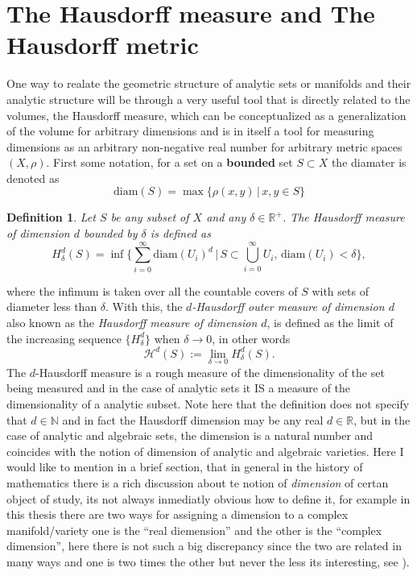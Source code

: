\documentclass[12pt,twoside,a4paper]{report}
\newtheorem{definition}{Definition}[section]
\newcommand{\nat}{\ensuremath{ \mathbb N }}
\newcommand{\re}{\ensuremath{\mathbb R }}
\begin{document}
  \section{The Hausdorff measure and The Hausdorff metric}
  \noindent One way to realate the geometric structure of analytic sets or manifolds and their analytic structure will be through a very useful tool that is directly related to the volumes, the Hausdorff measure, which can be conceptualized as a generalization of the volume for arbitrary dimensions and is in itself a tool for measuring dimensions as an arbitrary non-negative real number for arbitrary metric spaces $(X,\rho)$. First some notation, for a set on a \textbf{bounded} set $S\subset X$ the diamater is denoted as
  \[
  \textrm{diam}(S)=\max\{\rho(x,y)\,|\,x,y\in S\}
  \]
  \begin{definition}
  Let $S$ be any subset of $X$ and any $\delta\in\re^{+}$. The Hausdorff measure of dimension $d$ bounded by $\delta$ is defined as
  \[
  H_{\delta}^{d}(S)=\inf\Big\{\sum_{i=0}^{\infty}\mathrm{diam}(U_i)^{d}\,|\,S\subset\bigcup_{i=0}^{\infty}U_i,\,\mathrm{diam}(U_i)<\delta\Big\},
  \]
  \end{definition}
  \noindent where the infimum is taken over all the countable covers of $S$ with sets of diameter less than $\delta$. With this, the \emph{$d$-Hausdorff outer measure of dimension $d$} also known as the \emph{Hausdorff measure of dimension $d$}, is defined as the limit of the increasing sequence $\{H_{\delta}^d\}$ when $\delta\rightarrow 0$, in other words
  \[
  \mathcal{H}^d(S):=\lim_{\delta\rightarrow 0}H_{\delta}^d(S).
  \]
  The $d$-Hausdorff measure is a rough measure of the dimensionality of the set being measured and in the case of analytic sets it IS a measure of the dimensionality of a analytic subset. Note here that the definition does not specify that $d\in\nat$ and in fact the Hausdorff dimension may be any real $d\in\re$, but in the case of analytic and algebraic sets, the dimension is a natural number and coincides with the notion of dimension of analytic and algebraic varieties. Here I would like to mention in a brief section, that in general in the history of mathematics there is a rich discussion about te notion of \emph{dimension} of certan object of study, its not always inmediatly obvious how to define it, for example in this thesis there are two ways for assigning a dimension to a complex manifold/variety one is the ``real diemension'' and the other is the ``complex dimension'', here there is not such a big discrepancy since the two are related in many ways and one is two times the other but never the less its interesting, see \cite{YURI-MANIM:ON-THE-NOTION-OF-DIMENSION..}).
\end{document}
